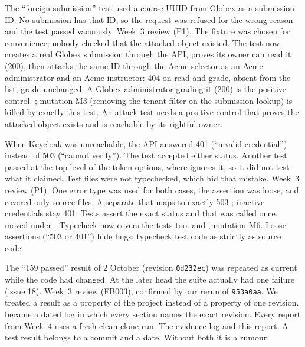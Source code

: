 {The ``foreign submission'' test used a course UUID from Globex as a submission ID. No submission has that ID, so the request was refused for the wrong reason and the test passed vacuously.}
{Week~3 review (P1).}
{The fixture was chosen for convenience; nobody checked that the attacked object existed.}
{The test now creates a real Globex submission through the API, proves its owner can read it (200), then attacks the same ID through the Acme selector as an Acme administrator and an Acme instructor: 404 on read and grade, absent from the list, grade unchanged. A Globex administrator grading it (200) is the positive control.}
{; mutation M3 (removing the tenant filter on the submission lookup) is killed by exactly this test.}
{An attack test needs a positive control that proves the attacked object exists and is reachable by its rightful owner.}

{When Keycloak was unreachable, the API answered 401 (``invalid credential'') instead of 503 (``cannot verify''). The test accepted either status. Another test passed  at the top level of the token options, where  ignores it, so it did not test what it claimed. Test files were not typechecked, which hid that mistake.}
{Week~3 review (P1).}
{One error type was used for both cases, the assertion was loose, and  covered only source files.}
{A separate  that maps to exactly 503 ; inactive credentials stay 401. Tests assert the exact status and that  was called once.  moved under . Typecheck now covers the tests too.}
{ and ; mutation M6.}
{Loose assertions (``503 or 401'') hide bugs; typecheck test code as strictly as source code.}

{The ``159 passed'' result of 2 October (revision \texttt{0d232ec}) was repeated as current while the code had changed. At the later head the suite actually had one failure (issue 18).}
{Week~3 review (FB003); confirmed by our rerun of \texttt{953a0aa}.}
{We treated a result as a property of the project instead of a property of one revision.}
{ became a dated log in which every section names the exact revision. Every report from Week~4 uses a fresh clean-clone run.}
{The evidence log and this report.}
{A test result belongs to a commit and a date. Without both it is a rumour.}


